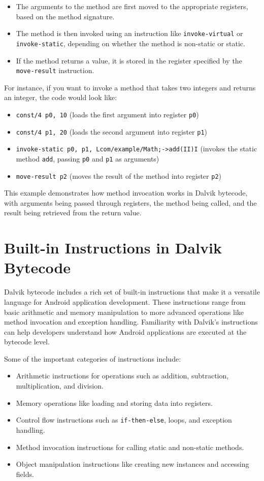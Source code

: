 \documentclass{article}
\begin{document}
\begin{itemize}
    \item The arguments to the method are first moved to the appropriate registers, based on the method signature.
    \item The method is then invoked using an instruction like \texttt{invoke-virtual} or \texttt{invoke-static}, depending on whether the method is non-static or static.
    \item If the method returns a value, it is stored in the register specified by the \texttt{move-result} instruction.
\end{itemize}

For instance, if you want to invoke a method that takes two integers and returns an integer, the code would look like:

\begin{itemize}
    \item \texttt{const/4 p0, 10} (loads the first argument into register \texttt{p0})
    \item \texttt{const/4 p1, 20} (loads the second argument into register \texttt{p1})
    \item \texttt{invoke-static {p0, p1}, Lcom/example/Math;->add(II)I} (invokes the static method \texttt{add}, passing \texttt{p0} and \texttt{p1} as arguments)
    \item \texttt{move-result p2} (moves the result of the method into register \texttt{p2})
\end{itemize}

This example demonstrates how method invocation works in Dalvik bytecode, with arguments being passed through registers, the method being called, and the result being retrieved from the return value.

\section{Built-in Instructions in Dalvik Bytecode}
Dalvik bytecode includes a rich set of built-in instructions that make it a versatile language for Android application development. These instructions range from basic arithmetic and memory manipulation to more advanced operations like method invocation and exception handling. Familiarity with Dalvik's instructions can help developers understand how Android applications are executed at the bytecode level.

Some of the important categories of instructions include:
\begin{itemize}
    \item Arithmetic instructions for operations such as addition, subtraction, multiplication, and division.
    \item Memory operations like loading and storing data into registers.
    \item Control flow instructions such as \texttt{if-then-else}, loops, and exception handling.
    \item Method invocation instructions for calling static and non-static methods.
    \item Object manipulation instructions like creating new instances and accessing fields.
\end{itemize}
\end{document}
